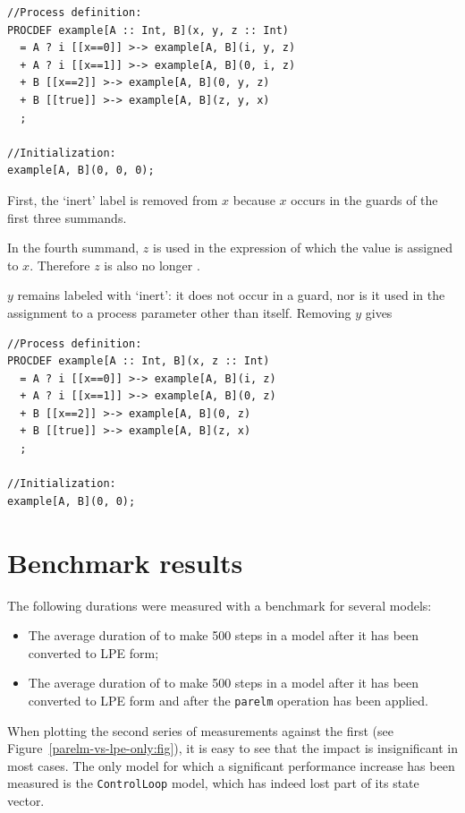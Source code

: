 \begin{lstlisting}
//Process definition:
PROCDEF example[A :: Int, B](x, y, z :: Int)
  = A ? i [[x==0]] >-> example[A, B](i, y, z)
  + A ? i [[x==1]] >-> example[A, B](0, i, z)
  + B [[x==2]] >-> example[A, B](0, y, z)
  + B [[true]] >-> example[A, B](z, y, x)
  ;

//Initialization:
example[A, B](0, 0, 0);
\end{lstlisting}

First, the `inert' label is removed from $x$ because $x$ occurs in the guards of the first three summands.

In the fourth summand, $z$ is used in the expression of which the value is assigned to $x$.
Therefore $z$ is also no longer .

$y$ remains labeled with `inert': it does not occur in a guard, nor is it used in the assignment to a process parameter other than itself.
Removing $y$ gives

\begin{lstlisting}
//Process definition:
PROCDEF example[A :: Int, B](x, z :: Int)
  = A ? i [[x==0]] >-> example[A, B](i, z)
  + A ? i [[x==1]] >-> example[A, B](0, z)
  + B [[x==2]] >-> example[A, B](0, z)
  + B [[true]] >-> example[A, B](z, x)
  ;

//Initialization:
example[A, B](0, 0);
\end{lstlisting}

\section{Benchmark results}

The following durations were measured with a benchmark for several models:
\begin{itemize}
\item The average duration of \txs{} to make 500 steps in a model after it has been converted to LPE form;
\item The average duration of \txs{} to make 500 steps in a model after it has been converted to LPE form and after the \texttt{parelm} operation has been applied.
\end{itemize}

When plotting the second series of measurements against the first (see Figure~\ref{parelm-vs-lpe-only:fig}), it is easy to see that the impact is insignificant in most cases.
The only model for which a significant performance increase has been measured is the \texttt{ControlLoop} model, which has indeed lost part of its state vector.

